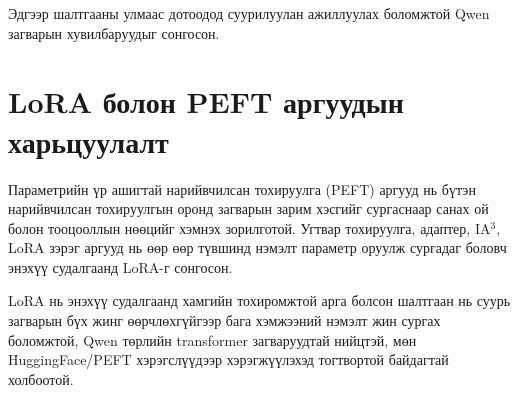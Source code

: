 Эдгээр шалтгааны улмаас дотоодод суурилуулан ажиллуулах боломжтой Qwen загварын хувилбаруудыг сонгосон.

\section{LoRA болон PEFT аргуудын харьцуулалт}

Параметрийн үр ашигтай нарийвчилсан тохируулга (PEFT) аргууд нь бүтэн нарийвчилсан тохируулгын оронд загварын зарим хэсгийг сургаснаар санах ой болон тооцооллын нөөцийг хэмнэх зорилготой. Угтвар тохируулга, адаптер, IA$^3$, LoRA зэрэг аргууд нь өөр өөр түвшинд нэмэлт параметр оруулж сургадаг боловч энэхүү судалгаанд LoRA-г сонгосон.

LoRA нь энэхүү судалгаанд хамгийн тохиромжтой арга болсон шалтгаан нь суурь загварын бүх жинг өөрчлөхгүйгээр бага хэмжээний нэмэлт жин сургах боломжтой, Qwen төрлийн transformer загваруудтай нийцтэй, мөн HuggingFace/PEFT хэрэгслүүдээр хэрэгжүүлэхэд тогтвортой байдагтай холбоотой.
